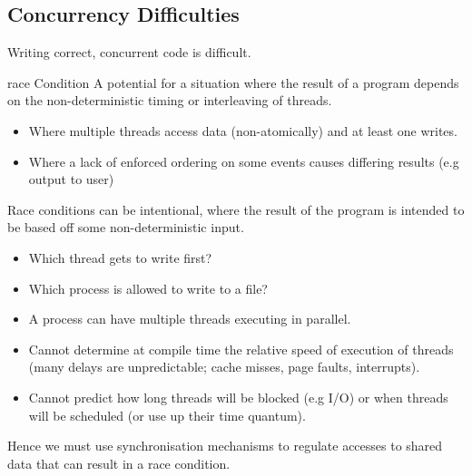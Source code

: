 \subsection{Concurrency Difficulties}
Writing correct, concurrent code is difficult.
\begin{definitionbox}{race Condition}
	A potential for a situation where the result of a program depends on the non-deterministic timing or interleaving of threads.
	\begin{itemize}
		\item Where multiple threads access data (non-atomically) and at least one writes.
		\item Where a lack of enforced ordering on some events causes differing results (e.g output to user)
	\end{itemize}
	Race conditions can be intentional, where the result of the program is intended to be based off some non-deterministic input.
	\begin{itemize}
		\item Which thread gets to write first?
		\item Which process is allowed to write to a file?
	\end{itemize}
\end{definitionbox}
\begin{itemize}
	\item A process can have multiple threads executing in parallel.
	\item Cannot determine at compile time the relative speed of execution of threads (many delays are unpredictable; cache misses, page faults, interrupts).
	\item Cannot predict how long threads will be blocked (e.g I/O) or when threads will be scheduled (or use up their time quantum).
\end{itemize}
Hence we must use synchronisation mechanisms to regulate accesses to shared data that can result in a race condition.

